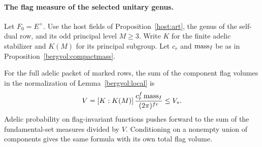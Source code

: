 \paragraph{The flag measure of the selected unitary genus.}
Let \(F_0=E^+\). Use the host fields of Proposition~\ref{host:art},
the genus of the self-dual row, and its odd principal level \(M\ge3\).
Write \(K\) for the finite adelic stabilizer and \(K(M)\) for its
principal subgroup. Let \(c_r\) and \({\rm mass}_I\) be as in
Proposition~\ref{bergvol:compactmass}.

\begin{proposition}\label{crev:mass}
For the full adelic packet of marked rows, the sum of the component
flag volumes in the normalization of Lemma~\ref{bergvol:local} is
\[
        V=[K:K(M)]\,\frac{c_r^f\,{\rm mass}_I}{(2\pi)^{fr}}
           \le V_* .
\]
Adelic probability on flag-invariant functions pushes forward to
the sum of the fundamental-set measures divided by \(V\).
Conditioning on a nonempty union of components gives the same
formula with its own total flag volume.
\end{proposition}
